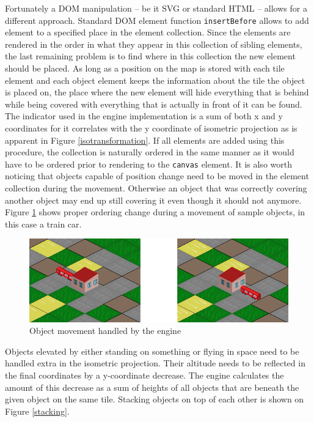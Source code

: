 \documentclass[11pt,oneside, final]{fithesis2}
\begin{document}
Fortunately a DOM manipulation -- be it SVG or standard HTML -- allows for a different approach. Standard DOM element function \texttt{insertBefore} allows to add element to a specified place in the element collection\cite{insertbefore}. Since the elements are rendered in the order in what they appear in this collection of sibling elements, the last remaining problem is to find where in this collection the new element should be placed. As long as a position on the map is stored with each tile element and each object element keeps the information about the tile the object is placed on, the place where the new element will hide everything that is behind while being covered with everything that is actually in front of it can be found. The indicator used in the engine implementation is a sum of both x and y coordinates for it correlates with the y coordinate of isometric projection as is apparent in Figure \ref{isotransformation}. If all elements are added using this procedure, the collection is naturally ordered in the same manner as it would have to be ordered prior to rendering to the \texttt{canvas} element. It is also worth noticing that objects capable of position change need to be moved in the element collection during the movement. Otherwise an object that was correctly covering another object may end up still covering it even though it should not anymore. Figure \ref{movement} shows proper ordering change during a movement of sample objects, in this case a train car.

\begin{figure}[h]
	\centering
	\includegraphics[width=\textwidth]{thesis-movement}
	\caption{Object movement handled by the engine}
	\label{movement}
\end{figure}

Objects elevated by either standing on something or flying in space need to be handled extra in the isometric projection. Their altitude needs to be reflected in the final coordinates by a y-coordinate decrease. The engine calculates the amount of this decrease as a sum of heights of all objects that are beneath the given object on the same tile. Stacking objects on top of each other is shown on Figure \ref{stacking}.
\end{document}
